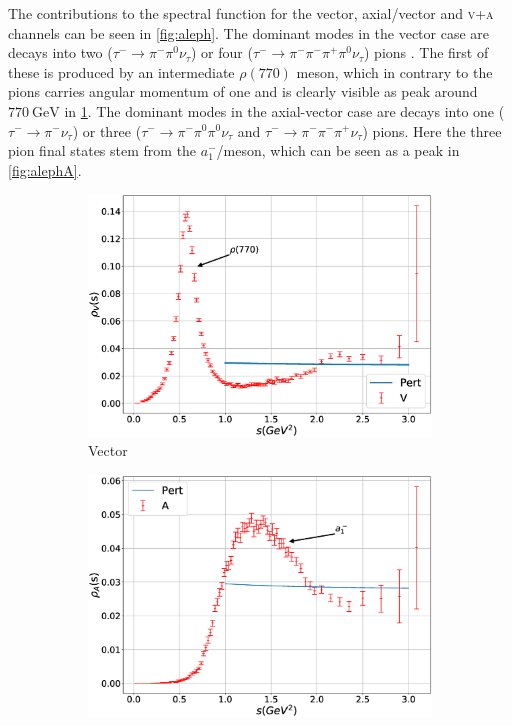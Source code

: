 \documentclass[../../index.tex]{subfiles}
\begin{document}
The contributions to the spectral function for the vector, axial\-/vector and
\textsc{v+a} channels can be seen in \cref{fig:aleph}. The dominant modes in the
vector case are decays into two (\(\tau^- \to \pi^-\pi^0 \nu_\tau\)) or four
(\(\tau^- \to \pi^- \pi^- \pi^+ \pi^0 \nu_\tau\)) pions \cite{Davier2006}. The
first of these is produced by an intermediate \(\rho(770)\) meson, which in
contrary to the pions carries angular momentum of one and is clearly visible as
peak around \(\SI{770}{\giga\eV}\) in \cref{fig:alephV}. The dominant modes in
the axial-vector case are decays into one (\(\tau^-\to \pi^-\nu_\tau\)) or three
(\(\tau^-\to \pi^- \pi^0 \pi^0 \nu_\tau\) and \(\tau^- \to \pi^- \pi^-
\pi^+\nu_\tau\)) pions. Here the three pion final states stem from the
\(a_1^-\)\-/meson, which can be seen as a peak in \cref{fig:alephA}.
\begin{figure}
  \centering
  \begin{subfigure}[b]{0.49\textwidth}
    \includegraphics[width=\textwidth]{./images/specFuncAleph_V.eps}
    \caption{Vector}
    \label{fig:alephV}
  \end{subfigure}
  \begin{subfigure}[b]{0.49\textwidth}
    \includegraphics[width=\textwidth]{./images/specFuncAleph_A.eps}

\end{subfigure}
\end{figure}
\end{document}
